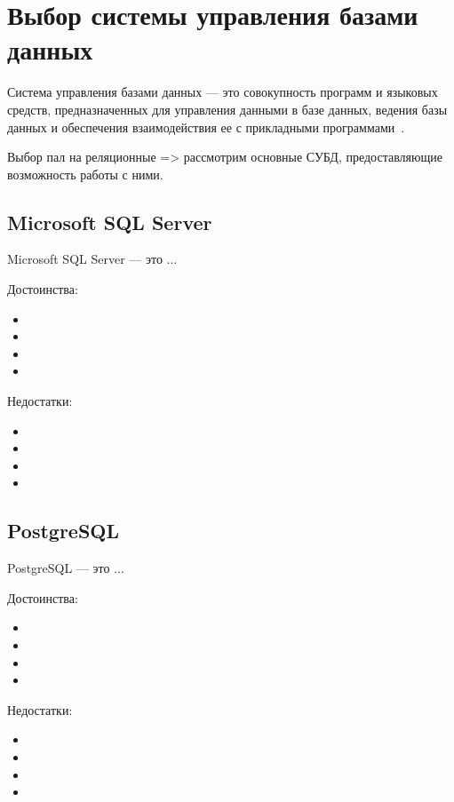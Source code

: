 \section{Выбор системы управления базами данных}

Система управления базами данных --- это совокупность программ и языковых
средств, предназначенных для управления данными в базе данных, ведения базы
данных и обеспечения взаимодействия ее с прикладными программами~\cite{gost01}.

Выбор пал на реляционные => рассмотрим основные СУБД, предоставляющие
возможность работы с ними.

\subsection{Microsoft SQL Server}

Microsoft SQL Server --- это ... 

Достоинства:
\begin{itemize}
    \item
    \item
    \item
    \item
\end{itemize}

Недостатки:
\begin{itemize}
    \item
    \item
    \item
    \item
\end{itemize}

\subsection{PostgreSQL}

PostgreSQL --- это ... 

Достоинства:
\begin{itemize}
    \item
    \item
    \item
    \item
\end{itemize}

Недостатки:
\begin{itemize}
    \item
    \item
    \item
    \item
\end{itemize}

